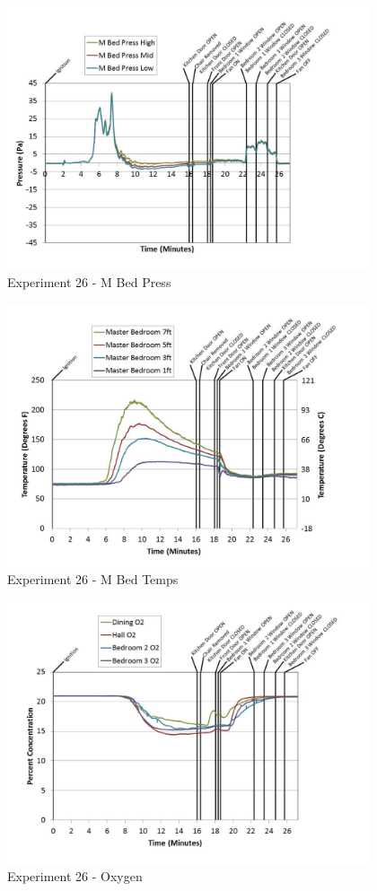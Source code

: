 \documentclass{article}
\begin{document}
\begin{appendices}
	\clearpage

	\begin{figure}[h!]
		\centering
		\includegraphics[height=3.05in]{0_Images/Results_Charts/Exp_26_Charts/MBedPress.pdf}
		\caption{Experiment 26 - M Bed Press}
	\end{figure}
 

	\begin{figure}[h!]
		\centering
		\includegraphics[height=3.05in]{0_Images/Results_Charts/Exp_26_Charts/MBedTemps.pdf}
		\caption{Experiment 26 - M Bed Temps}
	\end{figure}
 
	\clearpage

	\begin{figure}[h!]
		\centering
		\includegraphics[height=3.05in]{0_Images/Results_Charts/Exp_26_Charts/Oxygen.pdf}
		\caption{Experiment 26 - Oxygen}
	\end{figure}
 


\end{appendices}
\end{document}
